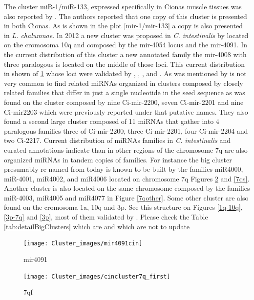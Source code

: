 \documentclass[11pt]{article}
\newcommand{\CAVH}[1]{\begingroup\color{red}#1\endgroup}
\begin{document}
The cluster miR-1/miR-133, expressed specifically in Cionas muscle tissues was also reported by \cite{Kusakabe2013}. The authors reported that one copy of this cluster is presented in both Cionas. As is shown in the plot \ref{mir-1/mir-133}  a copy is also presented in \textit{L. chalumnae}. In 2012 a new cluster was proposed in \textit{C. intestinalis}  by \cite{Terai2012} located on the cromosoma 10q and composed by the mir-4054 locus and the mir-4091. In the current distribution of this cluster a new annotated family the mir-4008 with three paralogous is located on the middle of those loci. This current distribution in shown of \ref{mir4091} whose loci were  validated by \cite{Norden-Krichmar2007}, \cite{Fu2008}, \cite{Hendrix2010}, and \cite{Terai2012}. As was mentioned by \cite{Hendrix2010} is not very common to find related miRNAs organized in clusters composed by closely related families that differ in just a single nucleotide in the seed sequence as was found on the cluster composed by  nine Ci-mir-2200, seven  Ci-mir-2201 and nine Ci-mir2203 which were previously reported under that putative names. They also found a second large cluster composed of 11 miRNAs that gather into 4 paralogous families three of Ci-mir-2200, three Ci-mir-2201, four Ci-mir-2204 and two Ci-2217. Current distribution of miRNAs families in \textit{C. intestinalis} and curated annotations indicate than in other regions of the chromosome 7q are also organized miRNAs in tandem copies of families. For instance the big cluster presumably re-named from \cite{Hendrix2010} today is known to be built by the families miR4000, miR-4001, miR4002, and miR4006 located on chromosome 7q Figures \ref{7qf} and \ref{7qs}. Another cluster is also located on the same chromosome composed by the families miR-4003, miR4005 and miR4077 in Figure \ref{7qother}. Some other cluster are also found on the cromosoma 1a, 10q and 3p. See this structure on Figures \ref{1q-10q}, \ref{3p-7q} and \ref{3p}, most of them validated by \cite{Hendrix2010}. \CAVH{Please check the Table \ref{tab:detailBigClusters} which are and which are not to update}


\begin{figure}[htb!]
\centering
\texttt{[image: Cluster\_images/mir4091cin]}  
\caption{mir4091}
\label{mir4091}
\end{figure}

\begin{figure}[htb!]
\centering
\texttt{[image: Cluster\_images/cincluster7q\_first]} 
\caption{7qf}
\label{7qf}
\end{figure}
\end{document}
